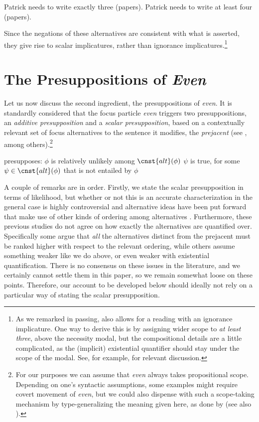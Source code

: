 \documentclass[output=paper]{langscibook}
\begin{document}
\ea
  \ea Patrick needs to write exactly three (papers).
  \ex Patrick needs to write at least four (papers).\z
\z

\noindent Since the negations of these alternatives are consistent with what is asserted, they give rise to scalar implicatures, rather than ignorance implicatures.\footnote{As we remarked in passing,  also allows for a reading with an ignorance implicature. One way to derive this is by assigning wider scope to \textit{at least three}, above the necessity modal, but the compositional details are a little complicated, as the (implicit) existential quantifier should stay under the scope of the modal. See, for example, \citet{krifka, hackl, beck} for relevant discussion.}


\section{The Presuppositions of \textit{Even}}
\label{don-sud:sec:even}

Let us now discuss the second ingredient, the presuppositions of \textit{even}. It is standardly considered that the focus particle \textit{even} triggers two presuppositions, an \textit{additive presupposition} and a \textit{scalar presupposition}, based on a contextually relevant set of focus alternatives to the sentence it modifies, the \textit{prejacent} (see \citealt{karttunenpeters, rooth, kay, wilkinson, crnic}, among others).\footnote{For our purposes we can assume that \textit{even} always takes propositional scope. Depending on one's syntactic assumptions, some examples might require covert movement of \textit{even}, but we could also dispense with such a scope-taking mechanism by type-generalizing the meaning given here, as done by \citet{rooth} (see also \citealt{panizzasudo}).\label{don-sud:scope}}

    \ea\label{don-sud:evensem}  presupposes:
        \ea $\phi$ is relatively unlikely among $\cnst{alt}(\phi)$ \hfill {}
        \ex $\psi$ is true, for some $\psi\in \cnst{alt}(\phi)$ that is not entailed by $\phi$ \hfill {}
        \z
    \z

\noindent A couple of remarks are in order. Firstly, we state the scalar presupposition in terms of likelihood, but whether or not this is an accurate characterization in the general case is highly controversial and alternative ideas have been put forward that make use of other kinds of ordering among alternatives \citep{rooth, kay, herburger, greenberg}. Furthermore, these previous studies do not agree on how exactly the alternatives are quantified over. Specifically some argue that \textit{all} the alternatives distinct from the prejacent must be ranked higher with respect to the relevant ordering, while others assume something weaker like we do above, or even weaker with existential quantification. There is no consensus on these issues in the literature, and we certainly cannot settle them in this paper, so we remain somewhat loose on these points. Therefore, our account to be developed below should ideally not rely on a particular way of stating the scalar presupposition.
\end{document}
